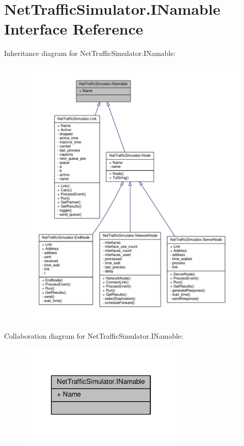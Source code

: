 \hypertarget{interfaceNetTrafficSimulator_1_1INamable}{\section{Net\-Traffic\-Simulator.\-I\-Namable Interface Reference}
\label{interfaceNetTrafficSimulator_1_1INamable}
}


Inheritance diagram for Net\-Traffic\-Simulator.\-I\-Namable\-:
\nopagebreak
\begin{figure}[H]
\begin{center}
\leavevmode
\includegraphics[width=350pt]{interfaceNetTrafficSimulator_1_1INamable__inherit__graph}
\end{center}
\end{figure}


Collaboration diagram for Net\-Traffic\-Simulator.\-I\-Namable\-:\nopagebreak
\begin{figure}[H]
\begin{center}
\leavevmode
\includegraphics[width=226pt]{interfaceNetTrafficSimulator_1_1INamable__coll__graph}
\end{center}
\end{figure}

